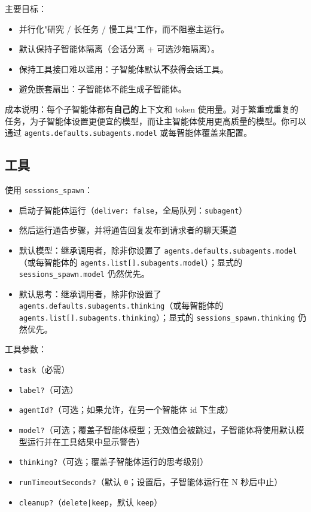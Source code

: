 主要目标：

\begin{itemize}
  \item 并行化"研究 / 长任务 / 慢工具"工作，而不阻塞主运行。
  \item 默认保持子智能体隔离（会话分离 + 可选沙箱隔离）。
  \item 保持工具接口难以滥用：子智能体默认\textbf{不}获得会话工具。
  \item 避免嵌套扇出：子智能体不能生成子智能体。
\end{itemize}


成本说明：每个子智能体都有\textbf{自己的}上下文和 token 使用量。对于繁重或重复的任务，为子智能体设置更便宜的模型，而让主智能体使用更高质量的模型。你可以通过 \texttt{agents.defaults.subagents.model} 或每智能体覆盖来配置。

\subsection{工具}


使用 \texttt{sessions\_spawn}：

\begin{itemize}
  \item 启动子智能体运行（\texttt{deliver: false}，全局队列：\texttt{subagent}）
  \item 然后运行通告步骤，并将通告回复发布到请求者的聊天渠道
  \item 默认模型：继承调用者，除非你设置了 \texttt{agents.defaults.subagents.model}（或每智能体的 \texttt{agents.list[].subagents.model}）；显式的 \texttt{sessions\_spawn.model} 仍然优先。
  \item 默认思考：继承调用者，除非你设置了 \texttt{agents.defaults.subagents.thinking}（或每智能体的 \texttt{agents.list[].subagents.thinking}）；显式的 \texttt{sessions\_spawn.thinking} 仍然优先。
\end{itemize}


工具参数：

\begin{itemize}
  \item \texttt{task}（必需）
  \item \texttt{label?}（可选）
  \item \texttt{agentId?}（可选；如果允许，在另一个智能体 id 下生成）
  \item \texttt{model?}（可选；覆盖子智能体模型；无效值会被跳过，子智能体将使用默认模型运行并在工具结果中显示警告）
  \item \texttt{thinking?}（可选；覆盖子智能体运行的思考级别）
  \item \texttt{runTimeoutSeconds?}（默认 \texttt{0}；设置后，子智能体运行在 N 秒后中止）
  \item \texttt{cleanup?}（\texttt{delete|keep}，默认 \texttt{keep}）
\end{itemize}


